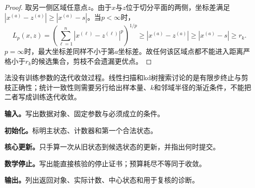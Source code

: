 \begin{proof}
取另一侧区域任意点$z$。由于$x$与$z$位于切分平面的两侧，坐标差满足$|x^{(a)}-z^{(a)}|\ge|x^{(a)}-s|$。当$p<\infty$时，
\[
L_p(x,z)=\left(\sum_{\ell=1}^{n}|x^{(\ell)}-z^{(\ell)}|^p\right)^{1/p}
\ge |x^{(a)}-z^{(a)}|
\ge |x^{(a)}-s|\ge r_k.
\]
$p=\infty$时，最大坐标差同样不小于第$a$坐标差。故任何该区域点都不能进入距离严格小于$r_k$的候选集合，剪枝不会遗漏更优点。
\end{proof}

\label{struct:V2-C02-CH19}
\label{struct:V2-C02-CH20}
\label{struct:V2-C02-CH21}
\label{struct:V2-C02-CH22}
\label{struct:V2-C02-CH23}
\label{struct:V2-C02-CH24}
\label{struct:V2-C02-CH25}
\begin{notapplicablebox}[title=有限步终止与统计一致性]
\kNN{}法没有训练参数的迭代收敛过程。线性扫描和kd树搜索讨论的是有限步终止与剪枝正确性；统计一致性则需要另行给出样本量、$k$和邻域半径的渐近条件，不能把二者写成训练迭代收敛。
\end{notapplicablebox}
\begin{keypointbox}[title={kd树的精确\kNN{}搜索：五步阅读}]
\textbf{输入。}写出数据对象、固定参数与必须成立的条件。\par
\textbf{初始化。}标明主状态、计数器和第一个合法状态。\par
\textbf{核心更新。}只手算一次从旧状态到候选状态的更新，并指出何时提交。\par
\textbf{数学停止。}写出能直接核验的停止证书；预算耗尽不等同于收敛。\par
\textbf{输出。}列出返回对象、实际计数、中心状态和用于复核的诊断。
\end{keypointbox}

